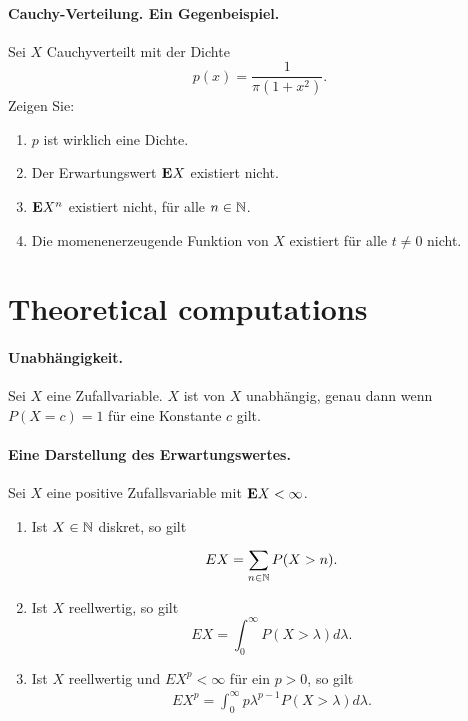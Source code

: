 \paragraph{Cauchy-Verteilung. Ein Gegenbeispiel.}
Sei $X$ Cauchyverteilt mit der Dichte
\begin{equation*}
    p(x) = \frac{1}{\pi (1+x^2)}.
\end{equation*}
Zeigen Sie:
\begin{enumerate}
    \item $p$ ist wirklich eine Dichte.
    \item Der Erwartungswert $\mathbf{E} X$ existiert nicht.
    \item $\mathbf{E} X^n$ existiert nicht, für alle $n\in \mathbb N$. 
    \item Die momenenerzeugende Funktion von $X$ existiert für alle $t \neq 0$ nicht. 
\end{enumerate}



\section{Theoretical computations}

\paragraph{Unabhängigkeit.} 
Sei $X$ eine Zufallvariable. $X$ ist von $X$ unabhängig, genau dann wenn
$P(X = c)=1$ für eine Konstante $c$ gilt. %

\paragraph{Eine Darstellung des Erwartungswertes. } Sei $X$ eine
positive Zufallsvariable mit $\mathbf{E} X < \infty$. 
\begin{enumerate}
    \item Ist $X \in \mathbb N$ diskret, so gilt
        \begin{equation}
            E X = \sum_{n\in\mathbb N}^{} P(X>n).
        \end{equation}
    \item Ist $X$ reellwertig, so gilt
        \begin{equation}
            E X = \int_{0}^{\infty} P(X>\lambda) d\lambda.
        \end{equation}
    \item Ist $X$ reellwertig und $E X^p<\infty$ für ein $p>0$, so gilt
        \begin{eqnarray}
            E X^p = \int_{0}^{\infty} p\lambda^{p-1} P(X>\lambda) d\lambda.
        \end{eqnarray}
\end{enumerate} 

